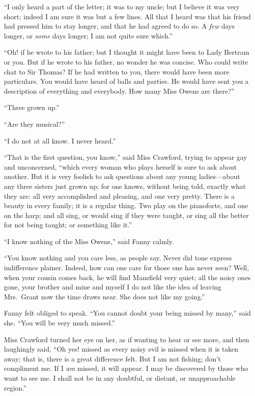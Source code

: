 ``I only heard a part of the letter; it was to my uncle;
but I believe it was very short; indeed I am sure it was
but a few lines.  All that I heard was that his friend
had pressed him to stay longer, and that he had agreed
to do so.  A \emph{few} days longer, or \emph{some} days longer;
I am not quite sure which.''

``Oh! if he wrote to his father; but I thought it might
have been to Lady Bertram or you.  But if he wrote to
his father, no wonder he was concise.  Who could write
chat to Sir Thomas?  If he had written to you, there would
have been more particulars.  You would have heard of
balls and parties.  He would have sent you a description
of everything and everybody.  How many Miss Owens are there?''

``Three grown up.''

``Are they musical?''

``I do not at all know.  I never heard.''

``That is the first question, you know,'' said Miss Crawford,
trying to appear gay and unconcerned, ``which every
woman who plays herself is sure to ask about another.
But it is very foolish to ask questions about any
young ladies---about any three sisters just grown up;
for one knows, without being told, exactly what they are:
all very accomplished and pleasing, and one very pretty.
There is a beauty in every family; it is a regular thing.
Two play on the pianoforte, and one on the harp;
and all sing, or would sing if they were taught,
or sing all the better for not being taught; or something
like it.''

``I know nothing of the Miss Owens,'' said Fanny calmly.

``You know nothing and you care less, as people say.
Never did tone express indifference plainer.  Indeed, how can
one care for those one has never seen?  Well, when your
cousin comes back, he will find Mansfield very quiet;
all the noisy ones gone, your brother and mine and myself
I do not like the idea of leaving Mrs.\ Grant now the time
draws near.  She does not like my going.''

Fanny felt obliged to speak.  ``You cannot doubt your being
missed by many,'' said she.  ``You will be very much missed.''

Miss Crawford turned her eye on her, as if wanting to hear
or see more, and then laughingly said, ``Oh yes! missed
as every noisy evil is missed when it is taken away;
that is, there is a great difference felt.  But I am
not fishing; don't compliment me.  If I \emph{am} missed,
it will appear.  I may be discovered by those who want
to see me.  I shall not be in any doubtful, or distant,
or unapproachable region.''

